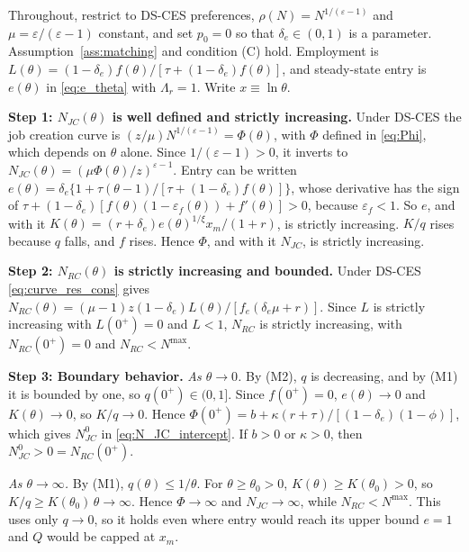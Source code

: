 \documentclass[authoryear, review, 12pt]{elsarticle}
\begin{document}
Throughout, restrict to DS-CES preferences, $\rho(N)=N^{1/(\varepsilon-1)}$ and
$\mu=\varepsilon/(\varepsilon-1)$ constant, and set $p_0=0$ so that $\delta_e\in(0,1)$ is
a parameter. Assumption~\ref{ass:matching} and condition (C) hold. Employment is
$L(\theta)=(1-\delta_e)f(\theta)/[\tau+(1-\delta_e)f(\theta)]$, and steady-state entry is
$e(\theta)$ in \eqref{eq:e_theta} with $\Lambda_r=1$. Write $x\equiv\ln\theta$.

\medskip\noindent\textbf{Step 1: $N_{JC}(\theta)$ is well defined and strictly increasing.}
Under DS-CES the job creation curve is $(z/\mu)N^{1/(\varepsilon-1)}=\Phi(\theta)$, with
$\Phi$ defined in \eqref{eq:Phi}, which depends on $\theta$ alone. Since $1/(\varepsilon-1)>0$, it inverts to
$N_{JC}(\theta)=(\mu\Phi(\theta)/z)^{\varepsilon-1}$. Entry can be written
$e(\theta)=\delta_e\{1+\tau(\theta-1)/[\tau+(1-\delta_e)f(\theta)]\}$, whose derivative has
the sign of $\tau+(1-\delta_e)[f(\theta)(1-\varepsilon_f(\theta))+f'(\theta)]>0$, because
$\varepsilon_f<1$. So $e$, and with it $K(\theta)=(r+\delta_e)e(\theta)^{1/\xi}x_m/(1+r)$,
is strictly increasing. $K/q$ rises because $q$ falls, and $f$ rises. Hence $\Phi$, and
with it $N_{JC}$, is strictly increasing.

\medskip\noindent\textbf{Step 2: $N_{RC}(\theta)$ is strictly increasing and bounded.}
Under DS-CES \eqref{eq:curve_res_cons} gives
$N_{RC}(\theta)=(\mu-1)z(1-\delta_e)L(\theta)/[f_e(\delta_e\mu+r)]$. Since $L$ is
strictly increasing with $L(0^+)=0$ and $L<1$, $N_{RC}$ is strictly increasing, with
$N_{RC}(0^+)=0$ and $N_{RC}<N^{\max}$.

\medskip\noindent\textbf{Step 3: Boundary behavior.}
\emph{As $\theta\to0$.} By (M2), $q$ is decreasing, and by (M1) it is bounded by one, so
$q(0^+)\in(0,1]$. Since
$f(0^+)=0$, $e(\theta)\to0$ and $K(\theta)\to0$, so $K/q\to0$. Hence
$\Phi(0^+)=b+\kappa(r+\tau)/[(1-\delta_e)(1-\phi)]$, which gives $N_{JC}^0$ in
\eqref{eq:N_JC_intercept}. If $b>0$ or $\kappa>0$, then $N_{JC}^0>0=N_{RC}(0^+)$.

\emph{As $\theta\to\infty$.} By (M1), $q(\theta)\leq1/\theta$. For $\theta\geq\theta_0>0$,
$K(\theta)\geq K(\theta_0)>0$, so $K/q\geq K(\theta_0)\,\theta\to\infty$. Hence
$\Phi\to\infty$ and $N_{JC}\to\infty$, while $N_{RC}<N^{\max}$. This uses only $q\to0$, so it
holds even where entry would reach its upper bound $e=1$ and $Q$ would be capped at $x_m$.
\end{document}
